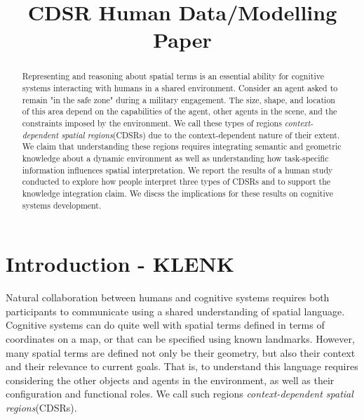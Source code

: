 \documentclass[11pt,letterpaper]{article}
\begin{document}
 

\title{CDSR Human Data/Modelling Paper}
 
\vskip 0.2in
 
\begin{abstract}
Representing and reasoning about spatial terms is an essential ability for cognitive systems interacting with humans in a shared environment.  Consider an agent asked to remain "in the safe zone" during a military engagement.  The size, shape, and location of this area depend on the capabilities of the agent, other agents in the scene, and the constraints imposed by the environment.  We call these types of regions \textit{context-dependent spatial regions}(CDSRs) due to the context-dependent nature of their extent.  We claim that understanding these regions requires integrating semantic and geometric knowledge about a dynamic environment as well as understanding how task-specific information influences spatial interpretation.  We report the results of a human study conducted to explore how people interpret three types of CDSRs and to support the knowledge integration claim.  We discss the implications for these results on cognitive systems development.
\end{abstract}

\section{Introduction - KLENK} 
Natural collaboration between humans and cognitive systems requires both participants to communicate using a shared understanding of spatial language.  Cognitive systems can do quite well with spatial terms defined in terms of coordinates on a map, or that can be specified using known landmarks.  However, many spatial terms are defined not only be their geometry, but also their context and their relevance to current goals.  That is, to understand this language requires considering the other objects and agents in the environment, as well as their configuration and functional roles.  We call such regions \textit{context-dependent spatial regions}(CDSRs).
\end{document}
